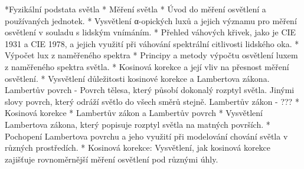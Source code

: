 \medskip
\begitems
    *Fyzikální podstata světla
    * Měření světla
    *     Úvod do měření osvětlení a používaných jednotek.
    *     Vysvětlení α-opických luxů a jejich významu pro měření osvětlení v souladu s lidským vnímáním.
    *     Přehled váhových křivek, jako je CIE 1931 a CIE 1978, a jejich využití při váhování spektrální citlivosti lidského oka.
    * Výpočet lux z naměřeného spektra
    *     Principy a metody výpočtu osvětlení luxem z naměřeného spektra světla.
    *     Kosinová korekce a její vliv na přesnost měření osvětlení.
       * Vysvětlení důležitosti kosinové korekce a Lambertova zákona.
Lambertův povrch - Povrch tělesa, který působí dokonalý rozptyl světla. Jinými slovy povrch, který odráží světlo do všech směrů stejně. 
Lambertův zákon - ???
    * Kosinová korekce
    * Lambertův zákon a Lambertův povrch
    *     Vysvětlení Lambertova zákona, který popisuje rozptyl světla na matných površích.
    *     Pochopení Lambertova povrchu a jeho využití při modelování chování světla v různých prostředích.
    *     Kosinová korekce: Vysvětlení, jak kosinová korekce zajišťuje rovnoměrnější měření osvětlení pod různými úhly.
\enditems

